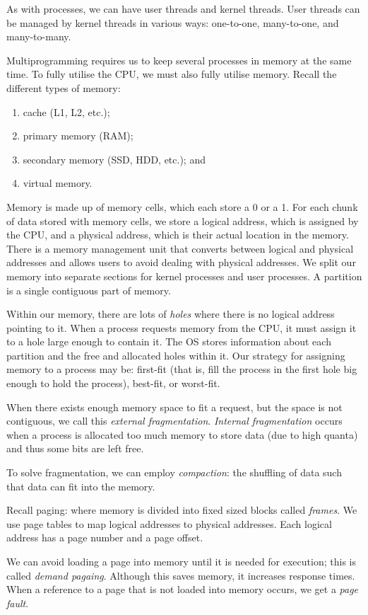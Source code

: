 As with processes, we can have user threads and kernel threads.
User threads can be managed by kernel threads in various ways:
one-to-one, many-to-one, and many-to-many.

Multiprogramming requires us to keep several processes in memory
at the same time.
To fully utilise the CPU, we must also fully utilise memory.
Recall the different types of memory:
\begin{enumerate}
	\item cache (L1, L2, etc.);
	\item primary memory (RAM);
	\item secondary memory (SSD, HDD, etc.); and
	\item virtual memory.
\end{enumerate}

Memory is made up of memory cells, which each store a 0 or a 1.
For each chunk of data stored with memory cells, we store 
a logical address, which is assigned by the CPU, and a physical address,
which is their actual location in the memory.
There is a memory management unit that converts between logical and physical
addresses and allows users to avoid dealing with physical addresses.
We split our memory into separate sections for kernel processes and user
processes.
A partition is a single contiguous part of memory.

Within our memory, there are lots of \emph{holes} where there is no logical
address pointing to it.
When a process requests memory from the CPU, it must assign it to a hole large
enough to contain it.
The OS stores information about each partition and the free and allocated holes
within it.
Our strategy for assigning memory to a process may be: first-fit (that is,
fill the process in the first hole big enough to hold the process),
best-fit, or worst-fit. 

\begin{definition}[Fragmentation]
	When there exists enough memory space to fit a request, but the space
	is not contiguous, we call this \emph{external fragmentation}.
	\emph{Internal fragmentation} occurs when a process is allocated too much
	memory to store data (due to high quanta) and thus some bits are left free.
\end{definition}

To solve fragmentation, we can employ \emph{compaction}: the shuffling of data
such that data can fit into the memory.

Recall paging: where memory is divided into fixed sized blocks called 
\emph{frames}. We use page tables to map logical addresses to physical
addresses.
Each logical address has a page number and a page offset.

We can avoid loading a page into memory until it is needed for execution;
this is called \emph{demand pagaing}. Although this saves memory,
it increases response times.
When a reference to a page that is not loaded into memory occurs, we get a
\emph{page fault}.